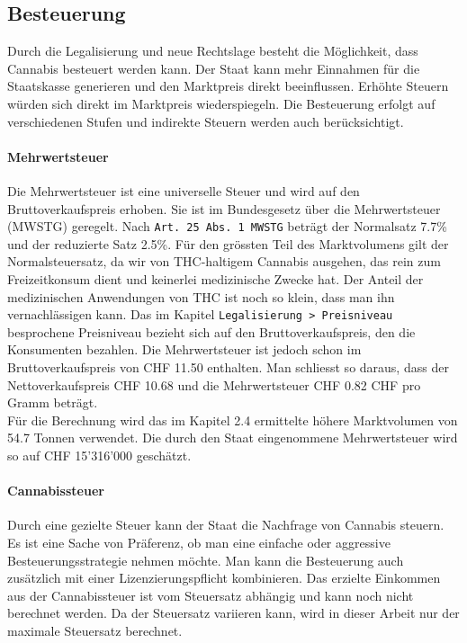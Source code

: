 \documentclass[../main.tex]{subfiles}
\begin{document}
	 
	 \subsection{Besteuerung}
	 Durch die Legalisierung und neue Rechtslage besteht die Möglichkeit, dass Cannabis besteuert werden kann.
	 Der Staat kann mehr Einnahmen für die Staatskasse generieren und den Marktpreis direkt beeinflussen.
	 Erhöhte Steuern würden sich direkt im Marktpreis wiederspiegeln.
	 Die Besteuerung erfolgt auf verschiedenen Stufen und indirekte Steuern werden auch berücksichtigt.
	 
	 \paragraph{Mehrwertsteuer}
	 Die Mehrwertsteuer ist eine universelle Steuer und wird auf den Bruttoverkaufspreis erhoben.
	 Sie ist im Bundesgesetz über die Mehrwertsteuer (MWSTG) geregelt.
	 Nach \texttt{Art. 25 Abs. 1 MWSTG} beträgt der Normalsatz 7.7\% und der reduzierte Satz 2.5\%.
	 Für den grössten Teil des Marktvolumens gilt der Normalsteuersatz, da wir von THC-haltigem Cannabis ausgehen, das rein zum Freizeitkonsum dient und keinerlei medizinische Zwecke hat. 
	 Der Anteil der medizinischen Anwendungen von THC ist noch so klein, dass man ihn vernachlässigen kann.
	 Das im Kapitel \texttt{Legalisierung > Preisniveau} besprochene Preisniveau bezieht sich auf den Bruttoverkaufspreis, den die Konsumenten bezahlen.
	 Die Mehrwertsteuer ist jedoch schon im Bruttoverkaufspreis von CHF 11.50 enthalten.
	 Man schliesst so daraus, dass der Nettoverkaufspreis CHF 10.68 und die Mehrwertsteuer CHF 0.82 CHF pro Gramm beträgt.\\
	 
	 \noindent
	 Für die Berechnung wird das im Kapitel 2.4 ermittelte höhere Marktvolumen von 54.7 Tonnen verwendet.	 
	 Die durch den Staat eingenommene Mehrwertsteuer wird so auf CHF 15'316'000 geschätzt.
	 	 
	 
	 \paragraph{Cannabissteuer}
	 Durch eine gezielte Steuer kann der Staat die Nachfrage von Cannabis steuern. 
	 Es ist eine Sache von Präferenz, ob man eine einfache oder aggressive Besteuerungsstrategie nehmen möchte.
	 Man kann die Besteuerung auch zusätzlich mit einer Lizenzierungspflicht kombinieren.
	 Das erzielte Einkommen aus der Cannabissteuer ist vom Steuersatz abhängig und kann noch nicht berechnet werden.
	 Da der Steuersatz variieren kann, wird in dieser Arbeit nur der maximale Steuersatz berechnet.\\
	 
\end{document}
